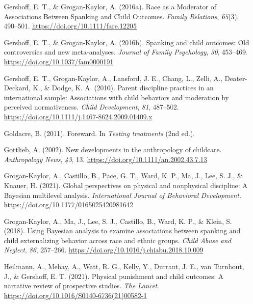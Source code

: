 \documentclass[
  letterpaper,
  DIV=11,
  numbers=noendperiod]{scrreprt}
\newlength{\cslhangindent}
\newlength{\cslentryspacingunit} %
\newenvironment{CSLReferences}[2] %
 {%
  \setlength{\parindent}{0pt}
  \ifodd #1
  \let\oldpar\par
  \def\par{\hangindent=\cslhangindent\oldpar}
  \fi
  \setlength{\parskip}{#2\cslentryspacingunit}
 }%
 {}
\begin{document}
\begin{CSLReferences}{1}{0}
\leavevmode{}%
Gershoff, E. T., \& Grogan-Kaylor, A. (2016a). {Race as a Moderator of
Associations Between Spanking and Child Outcomes}. \emph{Family
Relations}, \emph{65}(3), 490--501.
\url{https://doi.org/10.1111/fare.12205}

\leavevmode{}%
Gershoff, E. T., \& Grogan-Kaylor, A. (2016b). Spanking and child
outcomes: Old controversies and new meta-analyses. \emph{Journal of
Family Psychology}, \emph{30}, 453--469.
\url{https://doi.org/10.1037/fam0000191}

\leavevmode{}%
Gershoff, E. T., Grogan-Kaylor, A., Lansford, J. E., Chang, L., Zelli,
A., Deater-Deckard, K., \& Dodge, K. A. (2010). Parent discipline
practices in an international sample: Associations with child behaviors
and moderation by perceived normativeness. \emph{Child Development},
\emph{81}, 487--502.
\url{https://doi.org/10.1111/j.1467-8624.2009.01409.x}

\leavevmode{}%
Goldacre, B. (2011). {Foreward}. In \emph{Testing treatments} (2nd ed.).

\leavevmode{}%
Gottlieb, A. (2002). New developments in the anthropology of childcare.
\emph{Anthropology News}, \emph{43}, 13.
\url{https://doi.org/10.1111/an.2002.43.7.13}

\leavevmode{}%
Grogan-Kaylor, A., Castillo, B., Pace, G. T., Ward, K. P., Ma, J., Lee,
S. J., \& Knauer, H. (2021). {Global perspectives on physical and
nonphysical discipline: A {B}ayesian multilevel analysis}.
\emph{International Journal of Behavioral Development}.
\url{https://doi.org/10.1177/0165025420981642}

\leavevmode{}%
Grogan-Kaylor, A., Ma, J., Lee, S. J., Castillo, B., Ward, K. P., \&
Klein, S. (2018). Using {B}ayesian analysis to examine associations
between spanking and child externalizing behavior across race and ethnic
groups. \emph{Child Abuse and Neglect}, \emph{86}, 257--266.
\url{https://doi.org/10.1016/j.chiabu.2018.10.009}

\leavevmode{}%
Heilmann, A., Mehay, A., Watt, R. G., Kelly, Y., Durrant, J. E., van
Turnhout, J., \& Gershoff, E. T. (2021). Physical punishment and child
outcomes: A narrative review of prospective studies. \emph{The Lancet}.
\url{https://doi.org/10.1016/S0140-6736(21)00582-1}


\end{CSLReferences}
\end{document}
